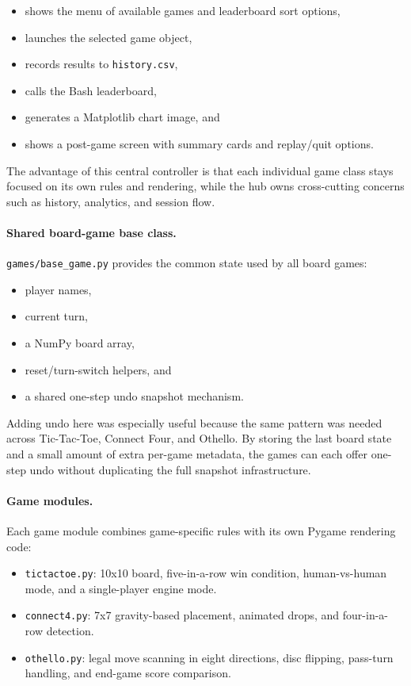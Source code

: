 \documentclass[12pt,a4paper]{article}
\begin{document}
\begin{itemize}[leftmargin=*]
    \item shows the menu of available games and leaderboard sort options,
    \item launches the selected game object,
    \item records results to \texttt{history.csv},
    \item calls the Bash leaderboard,
    \item generates a Matplotlib chart image, and
    \item shows a post-game screen with summary cards and replay/quit options.
\end{itemize}

The advantage of this central controller is that each individual game class stays focused on its own rules and rendering, while the hub owns cross-cutting concerns such as history, analytics, and session flow.

\paragraph{Shared board-game base class.}
\texttt{games/base\_game.py} provides the common state used by all board games:

\begin{itemize}[leftmargin=*]
    \item player names,
    \item current turn,
    \item a NumPy board array,
    \item reset/turn-switch helpers, and
    \item a shared one-step undo snapshot mechanism.
\end{itemize}

Adding undo here was especially useful because the same pattern was needed across Tic-Tac-Toe, Connect Four, and Othello. By storing the last board state and a small amount of extra per-game metadata, the games can each offer one-step undo without duplicating the full snapshot infrastructure.

\paragraph{Game modules.}
Each game module combines game-specific rules with its own Pygame rendering code:

\begin{itemize}[leftmargin=*]
    \item \texttt{tictactoe.py}: 10x10 board, five-in-a-row win condition, human-vs-human mode, and a single-player engine mode.
    \item \texttt{connect4.py}: 7x7 gravity-based placement, animated drops, and four-in-a-row detection.
    \item \texttt{othello.py}: legal move scanning in eight directions, disc flipping, pass-turn handling, and end-game score comparison.
\end{itemize}
\end{document}
